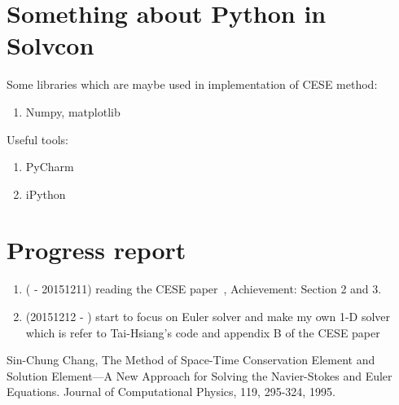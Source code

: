 \documentclass[a4paper,12pt,dvips]{article}
\begin{document}
\section{Something about Python in Solvcon}
Some libraries which are maybe used in implementation of CESE method: 
 \begin{enumerate}
  \item Numpy, matplotlib
 \end{enumerate}
Useful tools:
 \begin{enumerate}
  \item PyCharm
  \item iPython
 \end{enumerate}

\section{Progress report}
 \begin{enumerate}
  \item ( - 20151211) reading the CESE paper~\cite{CESE_Shin_Chung_Chang_1995}, Achievement: Section 2 and 3.
  \item (20151212 - ) start to focus on Euler solver and make my own 1-D solver which is refer to Tai-Hsiang's code and appendix B of the CESE paper~\cite{CESE_Shin_Chung_Chang_1995}
 \end{enumerate}



\begin{thebibliography}{99}
 Sin-Chung Chang, The Method of Space-Time Conservation Element and Solution Element—A New Approach for Solving the Navier-Stokes and Euler Equations. Journal of Computational Physics, 119, 295-324, 1995.
\end{thebibliography}
\end{document}
